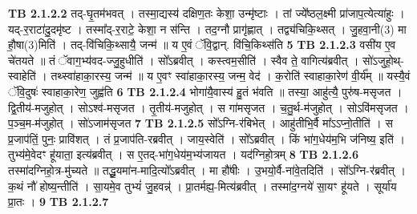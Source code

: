 \documentclass[17pt]{extarticle}
\begin{document}
                  \newline
                                \textbf{ TB 2.1.2.2} \newline
                  तद्-घृ॒तम॑भवत् । तस्मा॒द्यस्य॑ दक्षिण॒तः केशा॒ उन्मृ॑ष्टाः । तां ज्ये᳚ष्ठल॒क्ष्मी प्रा॑जाप॒त्येत्या॑हुः । यद्-र॒राटा॑दु॒दमृ॑ष्ट । तस्मा᳚द्-र॒राटे॒ केशा॒ न स॑न्ति । तद॒ग्नौ प्रागृ॑ह्णात् । तद्व्य॑चिकि॒थ्सत् । जु॒हवा॒नी(3) मा हौ॒षा(3)मिति॑ । तद्-वि॑चिकि॒थ्सायै॒ जन्म॑ ॥ य ए॒वं ॅवि॒द्वान्. वि॑चि॒किथ्स॑ति \textbf{ 5} \newline
                  \newline
                                \textbf{ TB 2.1.2.3} \newline
                  वसी॑य ए॒व चे॑तयते ॥ तं ॅवाग॒भ्य॑वद-ज्जु॒हुधीति॑ । सो᳚ऽब्रवीत् । कस्त्वम॒सीति॑ । स्वैव ते॒ वागित्य॑ब्रवीत् । सो॑ऽजुहो॒थ्-स्वाहेति॑ । तथ्स्वा॑हाका॒रस्य॒ जन्म॑ ॥ य ए॒वꣳ स्वा॑हाका॒रस्य॒ जन्म॒ वेद॑ । क॒रोति॑ स्वाहाका॒रेण॑ वी॒र्य᳚म् ॥ यस्यै॒वं ॅवि॒दुषः॑ स्वाहाका॒रेण॒ जुह्व॑ति \textbf{ 6} \newline
                  \newline
                                \textbf{ TB 2.1.2.4} \newline
                  भोगा॑यै॒वास्य॑ हु॒तं भ॑वति ॥ तस्या॒ आहु॑त्यै॒ पुरु॑ष-मसृजत । द्वि॒तीय॑-मजुहोत् । सोऽश्व॑-मसृजत । तृ॒तीय॑-मजुहोत् । स गा॑मसृजत । च॒तु॒र्थ-म॑जुहोत् । सोऽवि॑मसृजत । प॒ञ्च॒म-म॑जुहोत् । सो॑ऽजाम॑सृजत \textbf{ 7} \newline
                  \newline
                                \textbf{ TB 2.1.2.5} \newline
                  सो᳚ऽग्नि-र॑बिभेत् । आहु॑तीभि॒र्वै मा᳚ऽऽप्नो॒तीति॑ । स प्र॒जाप॑तिं॒ पुनः॒ प्रावि॑शत् । तं प्र॒जाप॑ति-रब्रवीत् । जाय॒स्वेति॑ । सो᳚ऽब्रवीत् । किं भा॑ग॒धेय॑म॒भि ज॑निष्य॒ इति॑ । तुभ्य॑मे॒वेदꣳ हू॑याता॒ इत्य॑ब्रवीत् । स ए॒तद्-भा॑ग॒धेय॑म॒भ्य॑जायत । यद॑ग्निहो॒त्रम् \textbf{ 8} \newline
                  \newline
                                \textbf{ TB 2.1.2.6} \newline
                  तस्मा॑दग्निहो॒त्र-मु॑च्यते ॥ तद्धू॒यमा॑न-मादि॒त्यो᳚ऽब्रवीत् । मा हौ॑षीः । उ॒भयो॒र्वै-ना॑वे॒तदिति॑ । सो᳚ऽग्नि-र॑ब्रवीत् । क॒थं नौ॑ होष्य॒न्तीति॑ । सा॒यमे॒व तुभ्यं॑ जु॒हवन्न्॑ । प्रा॒तर्मह्य॒-मित्य॑ब्रवीत् । तस्मा॑द॒ग्नये॑ सा॒यꣳ हू॑यते । सूर्या॑य प्रा॒तः । \textbf{ 9} \newline
                  \newline
                                \textbf{ TB 2.1.2.7} \newline
\end{document}
